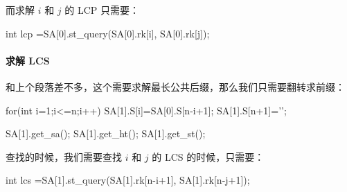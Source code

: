 而求解 $i$ 和 $j$ 的 LCP 只需要：
\begin{Cpp}
int lcp =SA[0].st_query(SA[0].rk[i], SA[0].rk[j]);
\end{Cpp}

\paragraph{求解 LCS}
和上个段落差不多，这个需要求解最长公共后缀，那么我们只需要翻转求前缀：
\begin{Cpp}
for(int i=1;i<=n;i++)
  SA[1].S[i]=SA[0].S[n-i+1];
SA[1].S[n+1]='\0';

SA[1].get_sa();
SA[1].get_ht();
SA[1].get_st();
\end{Cpp}

查找的时候，我们需要查找 $i$ 和 $j$ 的 LCS 的时候，只需要：
\begin{Cpp}
int lcs =SA[1].st_query(SA[1].rk[n-i+1], SA[1].rk[n-j+1]);
\end{Cpp}
